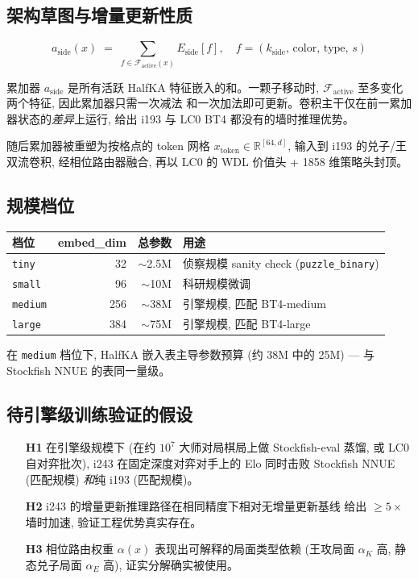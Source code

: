 \documentclass[10pt,a4paper]{article}
\begin{document}
\subsection{架构草图与增量更新性质}

\begin{equation*}
a_{\mathrm{side}}(x) \;=\; \sum_{f \in \mathcal{F}_{\mathrm{active}}(x)} E_{\mathrm{side}}[f],
\quad f = (k_{\mathrm{side}},\, \mathrm{color},\, \mathrm{type},\, s)
\end{equation*}

\noindent
累加器 $a_{\mathrm{side}}$ 是所有活跃 HalfKA 特征嵌入的和。一颗子移动时,
$\mathcal{F}_{\mathrm{active}}$ 至多变化两个特征, 因此累加器只需一次减法
和一次加法即可更新。卷积主干仅在前一累加器状态的\emph{差异}上运行, 给出
i193 与 LC0 BT4 都没有的墙时推理优势。

随后累加器被重塑为按格点的 token 网格
$x_{\mathrm{token}} \in \mathbb{R}^{[64,d]}$, 输入到 i193 的兑子/王
双流卷积, 经相位路由器融合, 再以 LC0 的 WDL 价值头 + 1858 维策略头封顶。

\subsection{规模档位}

\begin{footnotesize}
\begin{tabularx}{\linewidth}{@{}L r r L@{}}
\toprule
\textbf{档位} & \textbf{embed\_dim} & \textbf{总参数} & \textbf{用途} \\
\midrule
\texttt{tiny}   & 32  & $\sim$2.5M & 侦察规模 sanity check (\texttt{puzzle\_binary}) \\
\texttt{small}  & 96  & $\sim$10M  & 科研规模微调 \\
\texttt{medium} & 256 & $\sim$38M  & 引擎规模, 匹配 BT4-medium \\
\texttt{large}  & 384 & $\sim$75M  & 引擎规模, 匹配 BT4-large \\
\bottomrule
\end{tabularx}
\end{footnotesize}

在 \texttt{medium} 档位下, HalfKA 嵌入表主导参数预算 (约 38M 中的 25M)
--- 与 Stockfish NNUE 的表同一量级。

\subsection{待引擎级训练验证的假设}

\begin{itemize}
\item[\textbf{H1}] 在引擎级规模下 (在约 $10^{7}$ 大师对局棋局上做
Stockfish-eval 蒸馏, 或 LC0 自对弈批次), i243 在固定深度对弈对手上的
Elo 同时击败 Stockfish NNUE (匹配规模) \emph{和}纯 i193 (匹配规模)。
\item[\textbf{H2}] i243 的增量更新推理路径在相同精度下相对无增量更新基线
给出 $\geq 5\times$ 墙时加速, 验证工程优势真实存在。
\item[\textbf{H3}] 相位路由权重 $\alpha(x)$ 表现出可解释的局面类型依赖
(王攻局面 $\alpha_K$ 高, 静态兑子局面 $\alpha_E$ 高), 证实分解确实被使用。
\end{itemize}
\end{document}
